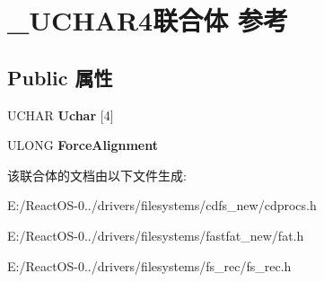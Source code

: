 \hypertarget{union___u_c_h_a_r4}{}\section{\+\_\+\+U\+C\+H\+A\+R4联合体 参考}
\label{union___u_c_h_a_r4}
\subsection*{Public 属性}
\begin{DoxyCompactItemize}
\item 
\mbox{\label{union___u_c_h_a_r4_a3e2640e0c8af8a3804b133bbadc00822}} 
U\+C\+H\+AR {\bfseries Uchar} \mbox{[}4\mbox{]}
\item 
\mbox{\label{union___u_c_h_a_r4_a7bb3ccb8aa94af35fd4f760da21b2db7}} 
U\+L\+O\+NG {\bfseries Force\+Alignment}
\end{DoxyCompactItemize}


该联合体的文档由以下文件生成\+:\begin{DoxyCompactItemize}
\item 
E\+:/\+React\+O\+S-\/0../drivers/filesystems/cdfs\+\_\+new/cdprocs.\+h\item 
E\+:/\+React\+O\+S-\/0../drivers/filesystems/fastfat\+\_\+new/fat.\+h\item 
E\+:/\+React\+O\+S-\/0../drivers/filesystems/fs\+\_\+rec/fs\+\_\+rec.\+h\end{DoxyCompactItemize}
